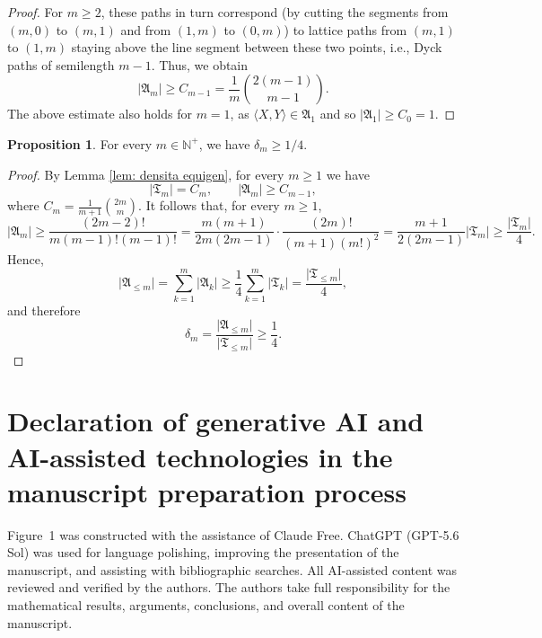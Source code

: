 \documentclass[a4paper,10pt,reqno]{amsart}
\theoremstyle{definition}
\newtheorem{proposition}[theorem]{Proposition}
\theoremstyle{definition}
\begin{document}
\begin{proof}
   For $m\ge 2$, these paths in turn correspond (by cutting the segments from $(m,0)$ to $(m,1)$ and from $(1,m)$ to $(0,m)$) to lattice paths from $(m,1)$ to $(1,m)$ staying above the line segment between these two points, i.e., Dyck paths of semilength $m-1$. Thus, we obtain
    \[ \lvert \mathfrak A_m \rvert \ge C_{m-1} = \frac{1}{m}\binom{2(m-1)}{m-1}.\]
    The above estimate also holds for $m=1$, as $\langle X,Y\rangle\in\mathfrak A_1$ and so $\lvert \mathfrak A_1 \rvert\ge C_0=1$.
\end{proof}



\begin{proposition}
    For every $m\in\mathbb N^+$, we have $\delta_m\ge 1/4$.%
\end{proposition}
\begin{proof}
    By Lemma \ref{lem: densita equigen}, for every $m\ge 1$ we have
    \[ \lvert \mathfrak T_m \rvert = C_m,\qquad\lvert \mathfrak A_m \rvert \ge C_{m-1}, \]
    where $C_m=\frac{1}{m+1}\binom{2m}{m}$. It follows that, for every $m\ge 1$,
    \[ \lvert \mathfrak A_m \rvert \ge \frac{(2m-2)!}{m(m-1)!(m-1)!} = \frac{m(m+1)}{2m(2m-1)}\cdot\frac{(2m)!}{(m+1)(m!)^2} = \frac{m+1}{2(2m-1)}\lvert \mathfrak T_m \rvert \ge \frac{\lvert \mathfrak T_m \rvert}{4}. \]
    Hence,
    \[ \lvert \mathfrak A_{\le m}\rvert = \sum_{k=1}^m \lvert \mathfrak A_k\rvert \ge \frac{1}{4}\sum_{k=1}^m \lvert \mathfrak T_k \rvert = \frac{\lvert \mathfrak T_{\le m} \rvert}{4},\]
    and therefore
    \[ \delta_m = \frac{\lvert \mathfrak A_{\le m} \rvert}{\lvert \mathfrak T_{\le m} \rvert} \ge \frac{1}{4}. \]
\end{proof}

\section*{Declaration of generative AI and AI-assisted technologies in the manuscript preparation process}
Figure~1 was constructed with the assistance of Claude Free. ChatGPT (GPT-5.6 Sol) was used for language polishing, improving the presentation of the manuscript, and assisting with bibliographic searches. All AI-assisted content was reviewed and verified by the authors. The authors take full responsibility for the mathematical results, arguments, conclusions, and overall content of the manuscript.
\end{document}
